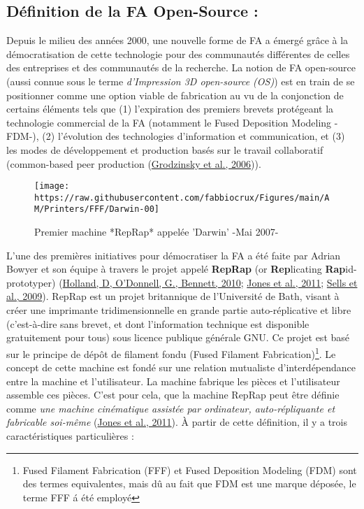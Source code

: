 \documentclass[
]{article}
\begin{document}
\hypertarget{duxe9finition-de-la-fa-open-source}{%
\subsection{Définition de la FA Open-Source :}\label{duxe9finition-de-la-fa-open-source}}

Depuis le milieu des années 2000, une nouvelle forme de FA a émergé grâce à la démocratisation de cette technologie pour des communautés différentes de celles des entreprises et des communautés de la recherche. La notion de FA open-source (aussi connue sous le terme \emph{d'Impression 3D open-source (OS)}) est en train de se positionner comme une option viable de fabrication au vu de la conjonction de certains éléments tels que (1) l'expiration des premiers brevets protégeant la technologie commercial de la FA (notamment le Fused Deposition Modeling -FDM-), (2) l'évolution des technologies d'information et communication, et (3) les modes de développement et production basés sur le travail collaboratif (common-based peer production (\protect\hyperlink{ref-Grodzinsky2006}{Grodzinsky et al., 2006})).

\begin{figure}

{\centering \texttt{[image: https://raw.githubusercontent.com/fabbiocrux/Figures/main/AM/Printers/FFF/Darwin-00]} 

}

\caption{Premier machine *RepRap* appelée 'Darwin' -Mai 2007-}\label{fig:darwing-reprap}
\end{figure}

L'une des premières initiatives pour démocratiser la FA a été faite par Adrian Bowyer et son équipe à travers le projet appelé \textbf{RepRap} (or \textbf{Rep}licating \textbf{Rap}id-prototyper) (\protect\hyperlink{ref-Holland2010}{Holland, D, O'Donnell, G., Bennett, 2010}; \protect\hyperlink{ref-Jones2011}{Jones et al., 2011}; \protect\hyperlink{ref-Sells2009a}{Sells et al., 2009}).
RepRap est un projet britannique de l'Université de Bath, visant à créer une imprimante tridimensionnelle en grande partie auto-réplicative et libre (c'est-à-dire sans brevet, et dont l'information technique est disponible gratuitement pour tous) sous licence publique générale GNU.
Ce projet est basé sur le principe de dépôt de filament fondu (Fused Filament Fabrication)\footnote{Fused Filament Fabrication (FFF) et Fused Deposition Modeling
  (FDM) sont des termes equivalentes, mais dû au fait que FDM est une
  marque déposée, le terme FFF á été employé}. Le concept de cette machine est fondé sur une relation mutualiste d'interdépendance entre la machine et l'utilisateur.
La machine fabrique les pièces et l'utilisateur assemble ces pièces.
C'est pour cela, que la machine RepRap peut être définie comme \emph{une machine cinématique assistée par ordinateur, auto-répliquante et fabricable soi-même} (\protect\hyperlink{ref-Jones2011}{Jones et al., 2011}).
À partir de cette définition, il y a trois caractéristiques particulières :
\end{document}
